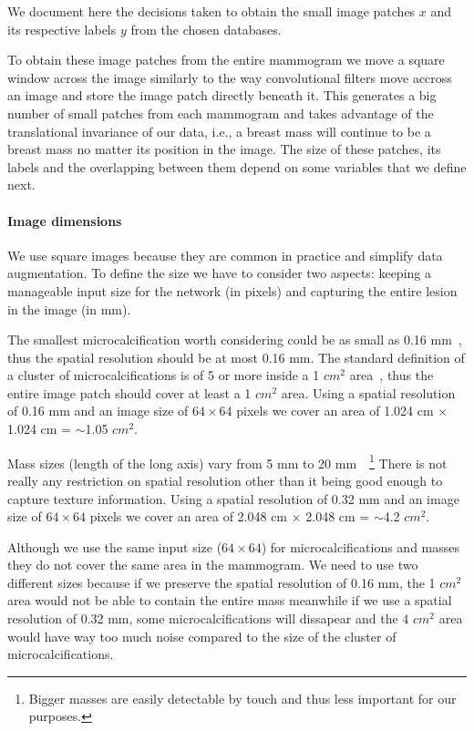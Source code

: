 We document here the decisions taken to obtain the small image patches $x$ and its respective labels $y$ from the chosen databases.

To obtain these image patches from the entire mammogram we move a square window across the image similarly to the way convolutional filters move accross an image and store the image patch directly beneath it. This generates a big number of small patches from each mammogram and takes advantage of the translational invariance of our data, i.e., a breast mass will continue to be a breast mass no matter its position in the image. The size of these patches, its labels and the overlapping between them depend on some variables that we define next.

\paragraph{Image dimensions}
We use square images because they are common in practice and simplify data augmentation. To define the size we have to consider two aspects: keeping a manageable input size for the network (in pixels) and capturing the entire lesion in the image (in mm).

The smallest microcalcification worth considering could be as small as 0.16 mm~\cite{Lo1998}, thus the spatial resolution should be at most 0.16 mm. The standard definition of a cluster of microcalcifications is of 5 or more inside a 1 $cm^2$ area~\cite{Sickles2013}, thus the entire image patch should cover at least a 1 $cm^2$ area. Using a spatial resolution of 0.16 mm and an image size of $64 \times 64$ pixels we cover an area of 1.024 cm $\times$ 1.024 cm = $\sim$1.05 $cm^2$.

Mass sizes (length of the long axis) vary from 5 mm to 20 mm~\cite{Sahiner1996}~\footnote{Bigger masses are easily detectable by touch and thus less important for our purposes.} There is not really any restriction on spatial resolution other than it being good enough to capture texture information. Using a spatial resolution of 0.32 mm and an image size of $64 \times 64$ pixels we cover an area of 2.048 cm $\times$ 2.048 cm = $\sim$4.2 $cm^2$.

Although we use the same input size ($64 \times 64$) for microcalcifications and masses they do not cover the same area in the mammogram. We need to use two different sizes because if we preserve the spatial resolution of 0.16 mm, the 1 $cm^2$ area would not be able to contain the entire mass meanwhile if we use a spatial resolution of 0.32 mm, some microcalcifications will dissapear and the 4 $cm^2$ area would have way too much noise compared to the size of the cluster of microcalcifications.

